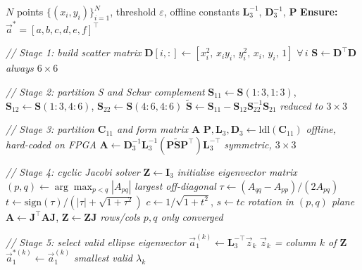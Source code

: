 \documentclass[colorlinks,upint,subscriptcorrection,varvw,hyphenate,balance,greek,russian,vietnamese,german]{asmeconf} %
\newcommand{\vect}[1]{\vec{#1}}
\begin{document}
\begin{algorithm}[h]
	\caption{Direct Ellipse Fitting Pipeline}
	\label{alg:ellipse}
	\begin{algorithmic}[1]
		\small
		\Require $N$ points $\{(x_i,y_i)\}_{i=1}^{N}$,\;
		threshold $\varepsilon$,\;
		offline constants $\mathbf{L}_3^{-1}$,
		$\mathbf{D}_3^{-1}$, $\mathbf{P}$
		\State \textbf{Ensure:} $\vect{a}^* = [a,b,c,d,e,f]^\top$
		
		\Statex \textit{// Stage 1: build scatter matrix}
		\State $\mathbf{D}[i,:]\!\leftarrow\!
		[x_i^2,\,x_iy_i,\,y_i^2,\,x_i,\,y_i,\,1]$
		\hfill $\forall\, i$
		\State $\mathbf{S} \leftarrow \mathbf{D}^\top\mathbf{D}$
		\hfill \textit{always $6\times6$}
		
		\Statex \textit{// Stage 2: partition S and Schur complement}
		\State $\mathbf{S}_{11}\!\leftarrow\!\mathbf{S}(1{:}3,1{:}3)$,\;
		$\mathbf{S}_{12}\!\leftarrow\!\mathbf{S}(1{:}3,4{:}6)$,\;
		$\mathbf{S}_{22}\!\leftarrow\!\mathbf{S}(4{:}6,4{:}6)$
		\State $\widetilde{\mathbf{S}} \leftarrow
		\mathbf{S}_{11} -
		\mathbf{S}_{12}\mathbf{S}_{22}^{-1}\mathbf{S}_{21}$
		\hfill \textit{reduced to $3\times3$}
		
		\Statex \textit{// Stage 3: partition $\mathbf{C}_{11}$
			and form matrix $\mathbf{A}$}
		\State $\mathbf{P},\mathbf{L}_3,\mathbf{D}_3 \leftarrow
		\mathrm{ldl}(\mathbf{C}_{11})$
		\hfill \textit{offline, hard-coded on FPGA}
		\State $\mathbf{A} \leftarrow
		\mathbf{D}_3^{-1}\mathbf{L}_3^{-1}
		(\mathbf{P}\widetilde{\mathbf{S}}\mathbf{P}^\top)
		\mathbf{L}_3^{-\top}$
		\hfill \textit{symmetric, $3\times3$}
		
		\Statex \textit{// Stage 4: cyclic Jacobi solver}
		\State $\mathbf{Z} \leftarrow \mathbf{I}_3$
		\hfill \textit{initialise eigenvector matrix}
		\Repeat
		\State $(p,q)\leftarrow
		\arg\max_{p<q}|A_{pq}|$
		\hfill \textit{largest off-diagonal}
		\State $\tau \leftarrow
		(A_{qq}-A_{pp})/(2A_{pq})$
		\State $t \leftarrow
		\mathrm{sign}(\tau)/
		(|\tau|+\sqrt{1+\tau^2})$
		\State $c \leftarrow 1/\sqrt{1+t^2}$,\;
		$s \leftarrow tc$
		\hfill \textit{rotation in $(p,q)$ plane}
		\State $\mathbf{A}\leftarrow
		\mathbf{J}^\top\mathbf{A}\mathbf{J}$,\;
		$\mathbf{Z}\leftarrow\mathbf{Z}\mathbf{J}$
		\hfill \textit{rows/cols $p,q$ only}
		\hfill \textit{converged}
		
		\Statex \textit{// Stage 5: select valid ellipse eigenvector}
		\State $\vect{a}_1^{(k)} \leftarrow
		\mathbf{L}_3^{-\top}\vect{z}_k$
		\hfill \textit{$\vect{z}_k$ = column $k$ of $\mathbf{Z}$}
		\State $\vect{a}_1^{*(k)} \leftarrow \vect{a}_1^{(k)}$
		\hfill \textit{smallest valid $\lambda_k$}
		\EndIf
		\EndFor
		

\end{algorithmic}
\end{algorithm}
\end{document}
